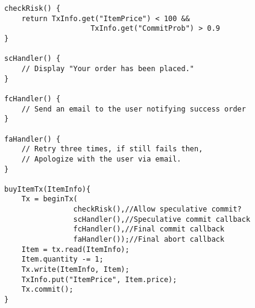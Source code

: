\begin{lstlisting}[caption=Example use case of the proposed programming model.]   
checkRisk() { 
    return TxInfo.get("ItemPrice") < 100 &&
                    TxInfo.get("CommitProb") > 0.9
}

scHandler() {
    // Display "Your order has been placed."
}

fcHandler() {
    // Send an email to the user notifying success order
}

faHandler() {
    // Retry three times, if still fails then,
    // Apologize with the user via email.
}

buyItemTx(ItemInfo){
    Tx = beginTx(
                checkRisk(),//Allow speculative commit?
                scHandler(),//Speculative commit callback
                fcHandler(),//Final commit callback
                faHandler());//Final abort callback
    Item = tx.read(ItemInfo);
    Item.quantity -= 1;
    Tx.write(ItemInfo, Item);
    TxInfo.put("ItemPrice", Item.price);
    Tx.commit();
}
\end{lstlisting}
%
%

